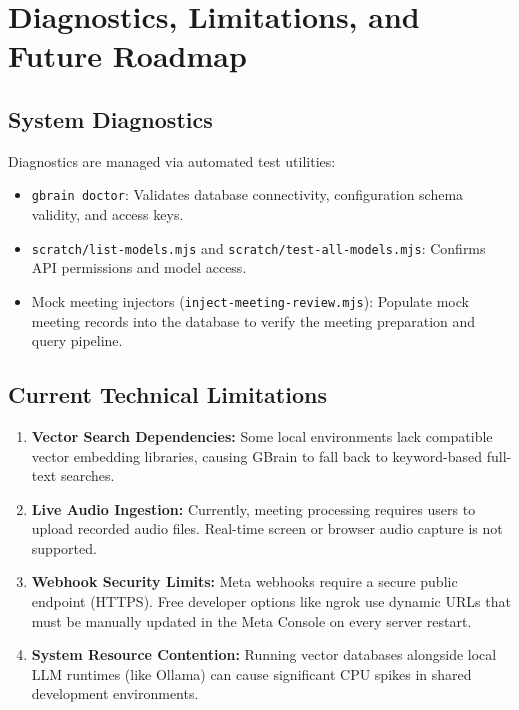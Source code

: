 \documentclass[12pt,a4paper]{report}
\begin{document}
\chapter{Diagnostics, Limitations, and Future Roadmap}
\label{chap:limitations}

\section{System Diagnostics}
Diagnostics are managed via automated test utilities:
\begin{itemize}
    \item \texttt{gbrain doctor}: Validates database connectivity, configuration schema validity, and access keys.
    \item \texttt{scratch/list-models.mjs} and \texttt{scratch/test-all-models.mjs}: Confirms API permissions and model access.
    \item Mock meeting injectors (\texttt{inject-meeting-review.mjs}): Populate mock meeting records into the database to verify the meeting preparation and query pipeline.
\end{itemize}

\section{Current Technical Limitations}
\begin{enumerate}
    \item \textbf{Vector Search Dependencies:} Some local environments lack compatible vector embedding libraries, causing GBrain to fall back to keyword-based full-text searches.
    \item \textbf{Live Audio Ingestion:} Currently, meeting processing requires users to upload recorded audio files. Real-time screen or browser audio capture is not supported.
    \item \textbf{Webhook Security Limits:} Meta webhooks require a secure public endpoint (HTTPS). Free developer options like ngrok use dynamic URLs that must be manually updated in the Meta Console on every server restart.
    \item \textbf{System Resource Contention:} Running vector databases alongside local LLM runtimes (like Ollama) can cause significant CPU spikes in shared development environments.
\end{enumerate}
\end{document}
